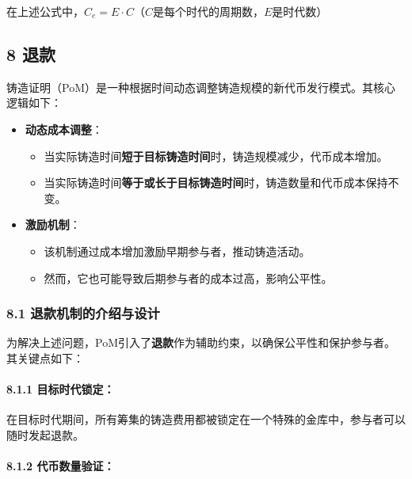 \documentclass[
]{article}
\providecommand{\tightlist}{%
  \setlength{\itemsep}{0pt}\setlength{\parskip}{0pt}}
\begin{document}
在上述公式中，\(C_e = E \cdot C\)（\(C\)是每个时代的周期数，\(E\)是时代数）

\subsection{8 退款}\label{ux9000ux6b3e}

铸造证明（PoM）是一种根据时间动态调整铸造规模的新代币发行模式。其核心逻辑如下：

\begin{itemize}
\tightlist
\item
  \textbf{动态成本调整}：

  \begin{itemize}
  \tightlist
  \item
    当实际铸造时间\textbf{短于目标铸造时间}时，铸造规模减少，代币成本增加。
  \item
    当实际铸造时间\textbf{等于或长于目标铸造时间}时，铸造数量和代币成本保持不变。
  \end{itemize}
\item
  \textbf{激励机制}：

  \begin{itemize}
  \tightlist
  \item
    该机制通过成本增加激励早期参与者，推动铸造活动。
  \item
    然而，它也可能导致后期参与者的成本过高，影响公平性。
  \end{itemize}
\end{itemize}

\subsubsection{8.1
退款机制的介绍与设计}\label{ux9000ux6b3eux673aux5236ux7684ux4ecbux7ecdux4e0eux8bbeux8ba1}

为解决上述问题，PoM引入了\textbf{退款}作为辅助约束，以确保公平性和保护参与者。其关键点如下：

\paragraph{8.1.1
目标时代锁定：}\label{ux76eeux6807ux65f6ux4ee3ux9501ux5b9a}

在目标时代期间，所有筹集的铸造费用都被锁定在一个特殊的金库中，参与者可以随时发起退款。

\paragraph{8.1.2
代币数量验证：}\label{ux4ee3ux5e01ux6570ux91cfux9a8cux8bc1}
\end{document}
